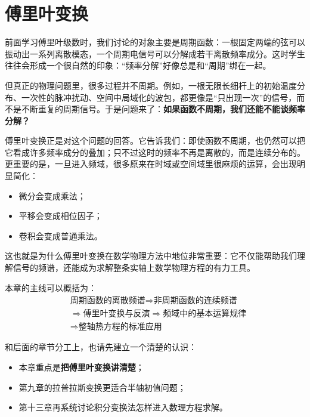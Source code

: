 
\chapter{傅里叶变换}

\begin{wulibj}[本章导读]
前面学习傅里叶级数时，我们讨论的对象主要是周期函数：一根固定两端的弦可以振动出一系列离散模态，一个周期电信号可以分解成若干离散频率成分。这时学生往往会形成一个很自然的印象：``频率分解''好像总是和``周期''绑在一起。

但真正的物理问题里，很多过程并不周期。例如，一根无限长细杆上的初始温度分布、一次性的脉冲扰动、空间中局域化的波包，都更像是``只出现一次''的信号，而不是不断重复的周期信号。于是问题来了：\textbf{如果函数不周期，我们还能不能谈频率分解？}

傅里叶变换正是对这个问题的回答。它告诉我们：即使函数不周期，也仍然可以把它看成许多频率成分的叠加；只不过这时的频率不再是离散的，而是连续分布的。更重要的是，一旦进入频域，很多原来在时域或空间域里很麻烦的运算，会出现明显简化：
\begin{itemize}
    \item 微分会变成乘法；
    \item 平移会变成相位因子；
    \item 卷积会变成普通乘法。
\end{itemize}

这也就是为什么傅里叶变换在数学物理方法中地位非常重要：它不仅能帮助我们理解信号的频谱，还能成为求解整条实轴上数学物理方程的有力工具。

本章的主线可以概括为：
\begin{equation}
    \begin{aligned}
        &\text{周期函数的离散频谱}
        \Longrightarrow
        \text{非周期函数的连续频谱} \\
        &\Longrightarrow
        \text{傅里叶变换与反演}
        \Longrightarrow
        \text{频域中的基本运算规律} \\
        &\Longrightarrow
        \text{整轴热方程的标准应用}
    \end{aligned}
\end{equation}

和后面的章节分工上，也请先建立一个清楚的认识：
\begin{itemize}
    \item 本章重点是\textbf{把傅里叶变换讲清楚}；
    \item 第九章的拉普拉斯变换更适合半轴初值问题；
    \item 第十三章再系统讨论积分变换法怎样进入数理方程求解。
\end{itemize}
\end{wulibj}

